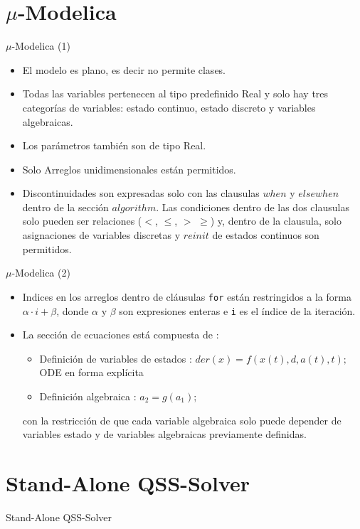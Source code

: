 \documentclass{beamer}
\begin{document}
\section{$\mu$-Modelica}
\begin{frame}{$\mu$-Modelica (1)}
	\begin{itemize}
	 \item<1-> El modelo es plano, es decir no permite clases.
	 \item<2-> Todas las variables pertenecen al tipo predefinido Real y solo hay tres categorías de variables: estado continuo, estado discreto y variables 
	algebraicas.
	 \item<3-> Los parámetros también son de tipo Real. 
	 \item<4-> Solo Arreglos unidimensionales están permitidos. 
	 \item<5-> Discontinuidades son expresadas solo con las clausulas $when$ y $elsewhen$ dentro de la sección $algorithm$. Las condiciones dentro de las dos 
	clausulas solo pueden ser relaciones ($<$, $\leqslant$, $>$ $\geqslant$) y, dentro de la clausula, solo asignaciones de variables discretas y $reinit$ 
	de estados continuos son permitidos.
	\end{itemize}
\end{frame}

\begin{frame}{$\mu$-Modelica (2)}
\begin{itemize}
	\item<1-> Indices en los arreglos dentro de cláusulas \texttt{for} están restringidos a la forma $\alpha \cdot i + \beta$, donde $\alpha$ y $\beta$ son expresiones enteras e \texttt{i} es el índice de la iteración.
	 \item<2-> La sección de ecuaciones está compuesta de :
	 \begin{itemize}
		\item Definición de variables de estados : $der(x) =  f (x(t), d, a(t), t);$ ODE en forma explícita
		\item Definición algebraica : $a_2  = g(a_1);$
	 \end{itemize}
	 con la restricción de que cada variable algebraica solo puede depender de variables estado y de variables algebraicas previamente definidas.
\end{itemize}
\end{frame}


\section{Stand-Alone QSS-Solver}
\begin{frame}[shrink=20]{Stand-Alone QSS-Solver}
	\inputminted[linenos]{modelica}{src/lotka_volterra_qss.mo}
\end{frame}
\end{document}
